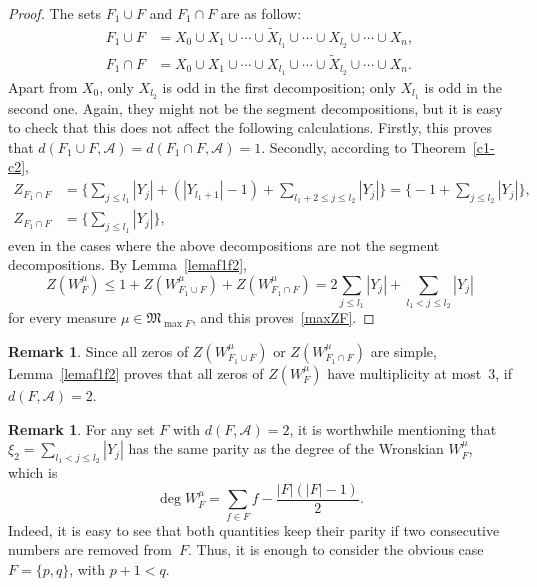 \documentclass[10pt]{article}
\theoremstyle{plain}
\theoremstyle{definition}
\newtheorem{remark}[theorem]{Remark}
\numberwithin{equation}{section} %
\newcommand\Ad{\mathcal{A}}
\newcommand\M{\mathfrak{M}}
\begin{document}
\begin{proof}
The sets $F_1 \cup F$ and $F_1 \cap F$ are as follow:
\begin{align*}
   F_1 \cup F &= X_0 \cup X_1 \cup \dotsb \cup \tilde{X}_{l_1} \cup \dotsb \cup
   X_{l_2} \cup \dotsb \cup X_n,
   \\
   F_1 \cap F &= X_0 \cup X_1 \cup \dotsb \cup X_{l_1} \cup \dotsb \cup
   \tilde{X}_{l_2} \cup \dotsb \cup X_n.
\end{align*}
Apart from $X_0$, only $X_{l_2}$ is odd in the first decomposition; only $X_{l_1}$ is odd in the second one. Again, they might not be the segment decompositions, but it is easy to check that this does not affect the following calculations. Firstly, this proves that $d(F_1 \cup F,\Ad) = d(F_1 \cap F,\Ad) = 1$. Secondly, according to Theorem~\ref{c1-c2},
\begin{align*}
   Z_{F_1 \cap F} &= \Big\{ \sum_{j \leq l_1} |Y_j|
   + (|Y_{l_1+1}|-1) + \sum_{l_1+2 \leq j \leq l_2} |Y_j| \Big\}
   = \Big\{-1 + \sum_{j \leq l_2} |Y_j| \Big\},
   \\
   Z_{F_1 \cap F} &= \Big\{ \sum_{j \leq l_1} |Y_j| \Big\},
\end{align*}
even in the cases where the above decompositions are not the segment decompositions. By Lemma~\ref{lemaf1f2},
\[
   Z(W^\mu_{F})
   \leq 1 + Z(W^\mu_{F_1 \cup F}) + Z(W^\mu_{F_1 \cap F})
   = 2 \sum_{j \leq l_1} |Y_j| + \sum_{l_1 < j \leq l_2} |Y_j|
\]
for every measure $\mu \in \M_{\max F}$, and this proves~\eqref{maxZF}.
\end{proof}

\begin{remark}
Since all zeros of $Z(W^\mu_{F_1 \cup F})$ or $Z(W^\mu_{F_1 \cap F})$ are simple, Lemma~\ref{lemaf1f2} proves that all zeros of $Z(W^\mu_F)$ have multiplicity at most~$3$, if $d(F,\Ad)=2$.
\end{remark}

\begin{remark}
For any set $F$ with $d(F,\Ad)=2$, it is worthwhile mentioning that $\xi_2 = \sum\limits_{l_1 < j \leq l_2} |Y_j|$ has the same parity as the degree of the Wronskian $W_F^\mu$, which is
\[
   \deg W_F^\mu=\sum_{f\in F}f-\frac{|F|(|F|-1)}{2}.
\]
Indeed, it is easy to see that both quantities keep their parity if two consecutive numbers are removed from~$F$. Thus, it is enough to consider the obvious case $F = \{p,q\}$, with $p+1 < q$.
\end{remark}
\end{document}
